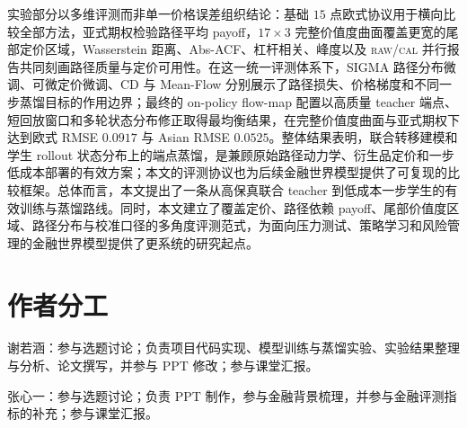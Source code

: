 \documentclass[11pt]{ctexart}
\newcommand{\raw}{\textsc{raw}}
\renewcommand{\cal}{\textsc{cal}}
\begin{document}
实验部分以多维评测而非单一价格误差组织结论：基础 $15$ 点欧式协议用于横向比较全部方法，亚式期权检验路径平均 payoff，$17\times3$ 完整价值度曲面覆盖更宽的尾部定价区域，Wasserstein 距离、Abs-ACF、杠杆相关、峰度以及 \raw{}/\cal{} 并行报告共同刻画路径质量与定价可用性。在这一统一评测体系下，SIGMA 路径分布微调、可微定价微调、CD 与 Mean-Flow 分别展示了路径损失、价格梯度和不同一步蒸馏目标的作用边界；最终的 on-policy flow-map 配置以高质量 teacher 端点、短回放窗口和多轮状态分布修正取得最均衡结果，在完整价值度曲面与亚式期权下达到欧式 RMSE $0.0917$ 与 Asian RMSE $0.0525$。整体结果表明，联合转移建模和学生 rollout 状态分布上的端点蒸馏，是兼顾原始路径动力学、衍生品定价和一步低成本部署的有效方案；本文的评测协议也为后续金融世界模型提供了可复现的比较框架。总体而言，本文提出了一条从高保真联合 teacher 到低成本一步学生的有效训练与蒸馏路线。同时，本文建立了覆盖定价、路径依赖 payoff、尾部价值度区域、路径分布与校准口径的多角度评测范式，为面向压力测试、策略学习和风险管理的金融世界模型提供了更系统的研究起点。

\section*{作者分工}

谢若涵：参与选题讨论；负责项目代码实现、模型训练与蒸馏实验、实验结果整理与分析、论文撰写，并参与 PPT 修改；参与课堂汇报。

张心一：参与选题讨论；负责 PPT 制作，参与金融背景梳理，并参与金融评测指标的补充；参与课堂汇报。



\end{document}
